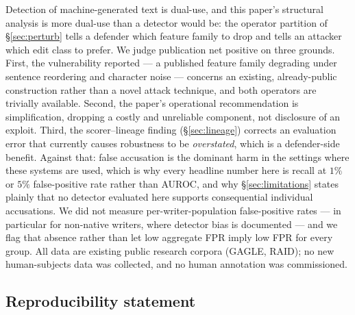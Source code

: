 \documentclass{article}
\begin{document}
Detection of machine-generated text is dual-use, and this paper's structural
analysis is more dual-use than a detector would be: the operator partition of
\S\ref{sec:perturb} tells a defender which feature family to drop and tells an
attacker which edit class to prefer. We judge publication net positive on three
grounds. First, the vulnerability reported --- a published feature family
degrading under sentence reordering and character noise --- concerns an existing,
already-public construction rather than a novel attack technique, and both
operators are trivially available. Second, the paper's operational
recommendation is simplification, dropping a costly and unreliable component,
not disclosure of an exploit. Third, the scorer--lineage finding
(\S\ref{sec:lineage}) corrects an evaluation error that currently causes
robustness to be \emph{overstated}, which is a defender-side benefit. Against
that: false accusation is the dominant harm in the settings where these systems
are used, which is why every headline number here is recall at $1\%$ or $5\%$
false-positive rate rather than AUROC, and why \S\ref{sec:limitations} states
plainly that no detector evaluated here supports consequential individual
accusations. We did not measure per-writer-population false-positive rates --- in
particular for non-native writers, where detector bias is documented --- and we
flag that absence rather than let low aggregate FPR imply low FPR for every
group. All data are existing public research corpora (GAGLE, RAID); no new
human-subjects data was collected, and no human annotation was commissioned.

\subsection*{Reproducibility statement}
\end{document}
